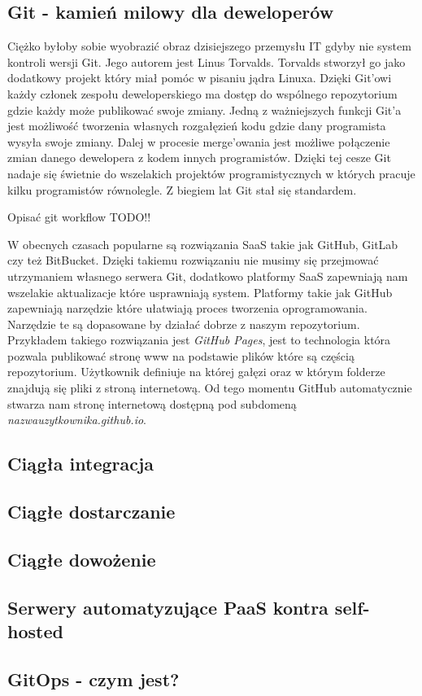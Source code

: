\subsection{Git - kamień milowy dla deweloperów}
Ciężko byłoby sobie wyobrazić obraz dzisiejszego przemysłu IT gdyby nie system kontroli wersji Git. Jego autorem jest Linus Torvalds. Torvalds stworzył go jako dodatkowy projekt który miał pomóc w pisaniu jądra Linuxa. Dzięki Git'owi każdy członek zespołu deweloperskiego ma dostęp do wspólnego repozytorium gdzie każdy może publikować swoje zmiany. Jedną z ważniejszych funkcji Git'a jest możliwość tworzenia własnych rozgałęzień kodu gdzie dany programista wysyła swoje zmiany. Dalej w procesie merge'owania jest możliwe połączenie zmian danego dewelopera z kodem innych programistów. Dzięki tej cesze Git nadaje się świetnie do wszelakich projektów programistycznych w których pracuje kilku programistów równolegle. Z biegiem lat Git stał się standardem.
\par
Opisać git workflow TODO!!
\par
W obecnych czasach popularne są rozwiązania SaaS takie jak GitHub, GitLab czy też BitBucket. Dzięki takiemu rozwiązaniu nie musimy się przejmować utrzymaniem własnego serwera Git, dodatkowo platformy SaaS zapewniają nam wszelakie aktualizacje które usprawniają system. Platformy takie jak GitHub zapewniają narzędzie które ułatwiają proces tworzenia oprogramowania. Narzędzie te są dopasowane by działać dobrze z naszym repozytorium. Przykładem takiego rozwiązania jest \textit{GitHub Pages}, jest to technologia która pozwala publikować stronę www na podstawie plików które są częścią repozytorium. Użytkownik definiuje na której gałęzi oraz w którym folderze znajdują się pliki z stroną internetową. Od tego momentu GitHub automatycznie stwarza nam stronę internetową dostępną pod subdomeną \textit{nazwauzytkownika.github.io}.
\subsection{Ciągła integracja}
\subsection{Ciągłe dostarczanie}
\subsection{Ciągłe dowożenie}
\subsection{Serwery automatyzujące PaaS kontra self-hosted}
\subsection{GitOps - czym jest?}